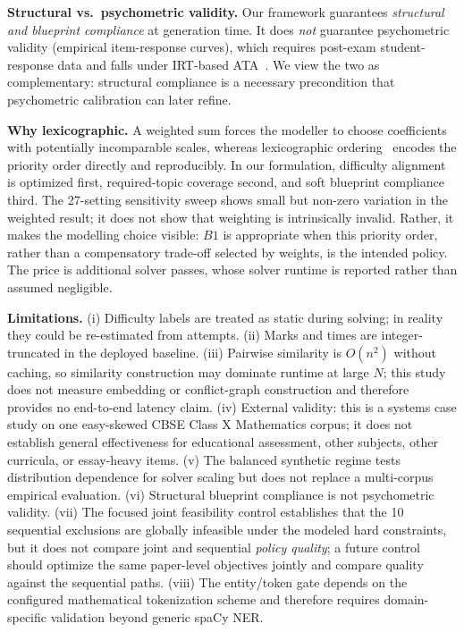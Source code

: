 \documentclass[runningheads]{llncs}
\begin{document}
\noindent\textbf{Structural vs.\ psychometric validity.} Our framework guarantees \emph{structural and blueprint compliance} at generation time.
It does \emph{not} guarantee psychometric validity (empirical item-response curves), which requires post-exam student-response data and falls under IRT-based ATA~\cite{lord1980,vanderLinden2005}.
We view the two as complementary: structural compliance is a necessary precondition that psychometric calibration can later refine.

\noindent\textbf{Why lexicographic.} A weighted sum forces the modeller to choose coefficients with potentially incomparable scales, whereas lexicographic ordering~\cite{ehrgott2005} encodes the priority order directly and reproducibly.
In our formulation, difficulty alignment is optimized first, required-topic coverage second, and soft blueprint compliance third.
The 27-setting sensitivity sweep shows small but non-zero variation in the weighted result;
it does not show that weighting is intrinsically invalid. Rather, it makes the modelling choice visible: $B1$ is appropriate when this priority order, rather than a compensatory trade-off selected by weights, is the intended policy.
The price is additional solver passes, whose solver runtime is reported rather than assumed negligible.

\noindent\textbf{Limitations.} (i) Difficulty labels are treated as static during solving; in reality they could be re-estimated from attempts.
(ii) Marks and times are integer-truncated in the deployed baseline.
(iii) Pairwise similarity is $O(n^2)$ without caching, so similarity construction may dominate runtime at large $N$;
this study does not measure embedding or conflict-graph construction and therefore provides no end-to-end latency claim.
(iv) External validity: this is a systems case study on one easy-skewed CBSE Class X Mathematics corpus;
it does not establish general effectiveness for educational assessment, other subjects, other curricula, or essay-heavy items.
(v) The balanced synthetic regime tests distribution dependence for solver scaling but does not replace a multi-corpus empirical evaluation.
(vi) Structural blueprint compliance is not psychometric validity. (vii) The focused joint feasibility control establishes that the 10 sequential exclusions are globally infeasible under the modeled hard constraints, but it does not compare joint and sequential \emph{policy quality}; a future control should optimize the same paper-level objectives jointly and compare quality against the sequential paths. (viii) The entity/token gate depends on the configured mathematical tokenization scheme and therefore requires domain-specific validation beyond generic spaCy NER.
\end{document}
